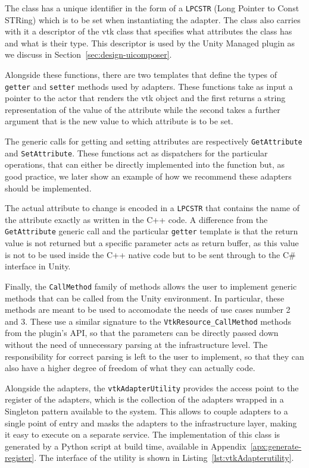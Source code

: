The class has a unique identifier in the form of a \verb|LPCSTR| (Long Pointer to Const STRing) which is to be set when instantiating the adapter. The class also carries with it a descriptor of the \acrshort{vtk} class that specifies what attributes the class has and what is their type. This descriptor is used by the Unity Managed plugin as we discuss in Section~\ref{sec:design-uicomposer}.

Alongside these functions, there are two templates that define the types of \verb|getter| and \verb|setter| methods used by adapters. These functions take as input a pointer to the actor that renders the \acrshort{vtk} object and the first returns a string representation of the value of the attribute while the second takes a further argument that is the new value to which attribute is to be set.

The generic calls for getting and setting attributes are respectively \verb|GetAttribute| and \verb|SetAttribute|. These functions act as dispatchers for the particular operations, that can either be directly implemented into the function but, as good practice, we later show an example of how we recommend these adapters should be implemented.

The actual attribute to change is encoded in a \verb|LPCSTR| that contains the name of the attribute exactly as written in the C++ code. A difference from the \verb|GetAttribute| generic call and the particular \verb|getter| template is that the return value is not returned but a specific parameter acts as return buffer, as this value is not to be used inside the C++ native code but to be sent through to the C\# interface in Unity.

Finally, the \verb|CallMethod| family of methods allows the user to implement generic methods that can be called from the Unity environment. In particular, these methods are meant to be used to accomodate the needs of use cases number 2 and 3. These use a similar signature to the \verb|VtkResource_CallMethod| methods from the plugin's API, so that the parameters can be directly passed down without the need of unnecessary parsing at the infrastructure level. The responsibility for correct parsing is left to the user to implement, so that they can also have a higher degree of freedom of what they can actually code.

Alongside the adapters, the \verb|vtkAdapterUtility| provides the access point to the register of the adapters, which is the collection of the adapters wrapped in a Singleton pattern available to the system. This allows to couple adapters to a single point of entry and masks the adapters to the infrastructure layer, making it easy to execute on a separate service. The implementation of this class is generated by a Python script at build time, available in Appendix~\ref{apx:generate-register}. The interface of the utility is shown in Listing~\ref{lst:vtkAdapterutility}.

